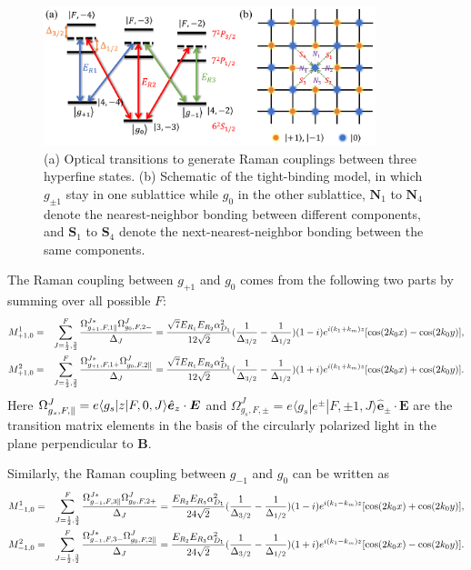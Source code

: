 \documentclass[aps,prl,floatfix,twocolumn,reprint]{revtex4}
\begin{document}
\begin{figure}[h]
\centering
\includegraphics[width=3.8in]{Fig_SOC.pdf}
\caption{(a) Optical transitions to generate Raman couplings between three
hyperfine states. (b) Schematic of the tight-binding model, in which $g_{\pm
1}$ stay in one sublattice while $g_0$ in the other sublattice, ${\bm{N}}%
_{1} $ to ${\bm{N}}_{4}$ denote the nearest-neighbor bonding between
different components, and ${\bm{S}}_{1}$ to ${\bm{S}}_{4}$ denote the
next-nearest-neighbor bonding between the same components.}
\label{raman}
\end{figure}

The Raman coupling between $g_{+1}$ and $g_{0}$ comes from the following two
parts by summing over all possible $F$:
\begin{eqnarray*}
M_{+1,0}^{1} &=&\sum_{J=\frac{1}{2},\frac{3}{2}}^{F}\frac{\Omega
_{g_{+1},F,1\parallel }^{J\ast }\Omega _{g_{0},F,2-}^{J}}{\Delta _{J}}=\frac{%
\sqrt{7}E_{R_{1}}E_{R_{2}}\alpha _{D_{1}}^{2}}{12\sqrt{2}}(\frac{1}{\Delta
_{3/2}}-\frac{1}{\Delta _{1/2}})(1-i)e^{i(k_{1}+k_{m})z}[\cos (2k_{0}x)-\cos
(2k_{0}y)], \\
M_{+1,0}^{2} &=&\sum_{J=\frac{1}{2},\frac{3}{2}}^{F}\frac{\Omega
_{g_{+1},F,1+}^{J\ast }\Omega _{g_{0},F,2\parallel }^{J}}{\Delta _{J}}=\frac{%
\sqrt{7}E_{R_{1}}E_{R_{2}}\alpha _{D_{1}}^{2}}{12\sqrt{2}}(\frac{1}{\Delta
_{3/2}}-\frac{1}{\Delta _{1/2}})(1+i)e^{i(k_{1}+k_{m})z}[\cos (2k_{0}x)+\cos
(2k_{0}y)].
\end{eqnarray*}%
Here $\Omega _{g_{s},F,\parallel}^{J}=e\langle g_{s}|z|F,0,J\rangle \hat{%
\bm{e}}_{z}\cdot \bm{E}$ and $\Omega _{g_{s},F,\pm }^{J}=e\langle
g_{s}|e^{\pm }|F,\pm 1,J\rangle\hat{\bm{e}}_{\pm }\cdot\bm{E}$ are the
transition matrix elements in the basis of the circularly polarized light in
the plane perpendicular to $\bm{B}$.

Similarly, the Raman coupling between $g_{-1}$ and $g_{0}$ can be written as
\begin{eqnarray}
M_{-1,0}^{1} &=&\sum_{J=\frac{1}{2},\frac{3}{2}}^{F}\frac{\Omega
_{g_{-1},F,3\parallel }^{J\ast }\Omega _{g_{0},F,2+}^{J}}{\Delta _{J}}=\frac{%
E_{R_{2}}E_{R_{3}}\alpha _{D_{1}}^{2}}{24\sqrt{2}}(\frac{1}{\Delta _{3/2}}-%
\frac{1}{\Delta _{1/2}})(1-i)e^{i(k_{1}-k_{m})z}[\cos (2k_{0}x)+\cos
(2k_{0}y)], \\
M_{-1,0}^{2} &=&\sum_{J=\frac{1}{2},\frac{3}{2}}^{F}\frac{\Omega
_{g_{-1},F,3-}^{J\ast }\Omega _{g_{0},F,2\parallel }^{J}}{\Delta _{J}}=\frac{%
E_{R_{2}}E_{R_{3}}\alpha _{D_{1}}^{2}}{24\sqrt{2}}(\frac{1}{\Delta _{3/2}}-%
\frac{1}{\Delta _{1/2}})(1+i)e^{i(k_{1}-k_{m})z}[\cos (2k_{0}x)-\cos
(2k_{0}y)].
\end{eqnarray}
\end{document}
